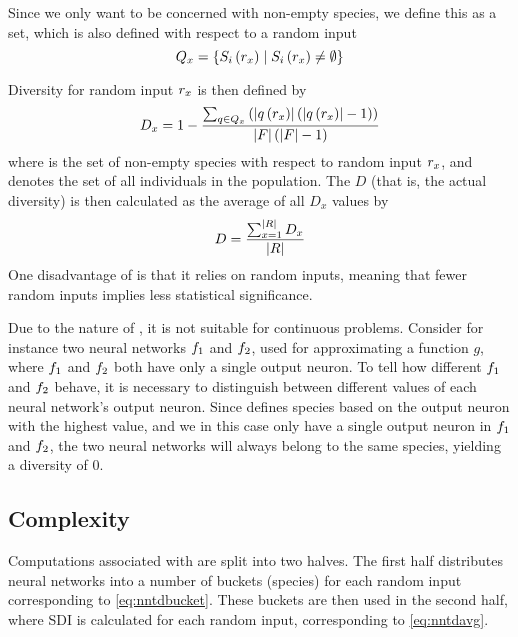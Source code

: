 Since we only want to be concerned with non-empty species, we define this as a set, which is also defined with respect to a random input
\begin{equation*}\label{eq:nonemptyspecies}
  Q_{x} = \left\{ S_{i}\left(r_x\right) \mid S_{i}\left(r_x\right) \neq \emptyset \right\}
\end{equation*}

Diversity for random input $r_x$ is then defined by
%
\begin{equation*}\label{eq:nntd}
  D_x = 1 - \frac{\sum_{q \in Q_{x}}\left(\lvert q\left(r_x\right)\rvert\left(\lvert q\left(r_x\right)\rvert - 1\right)\right)}{\lvert F\rvert\left(\lvert F\rvert - 1\right)}
\end{equation*}
%
where  is the set of non-empty species with respect to random input $r_x$, and \indset{} denotes the set of all individuals in the population. The \dia{} $D$ (that is, the actual diversity) is then calculated as the average of all \ransetl{} $D_x$ values by
%
\begin{equation}\label{eq:nntdavg}
  D =\frac{\sum_{x=1}^{\lvert R\rvert}{D_x}}{\lvert R\rvert}
\end{equation}
%
One disadvantage of \dia{} is that it relies on random inputs, meaning that fewer random inputs implies less statistical significance. 

Due to the nature of \dia, it is not suitable for continuous problems. Consider for instance two neural networks $f_1$ and $f_2$, used for approximating a function $g$, where $f_1$ and $f_2$ both have only a single output neuron. To tell how different $f_1$ and $f_2$ behave, it is necessary to distinguish between different values of each neural network's output neuron. Since \dia{} defines species based on the output neuron with the highest value, and we in this case only have a single output neuron in $f_1$ and $f_2$, the two neural networks will always belong to the same species, yielding a diversity of 0.  

\subsection{Complexity}
Computations associated with \dia{} are split into two halves. The first half distributes neural networks into a number of buckets (species) for each random input corresponding to \cref{eq:nntdbucket}. These buckets are then used in the second half, where SDI is calculated for each random input, corresponding to \cref{eq:nntdavg}.

